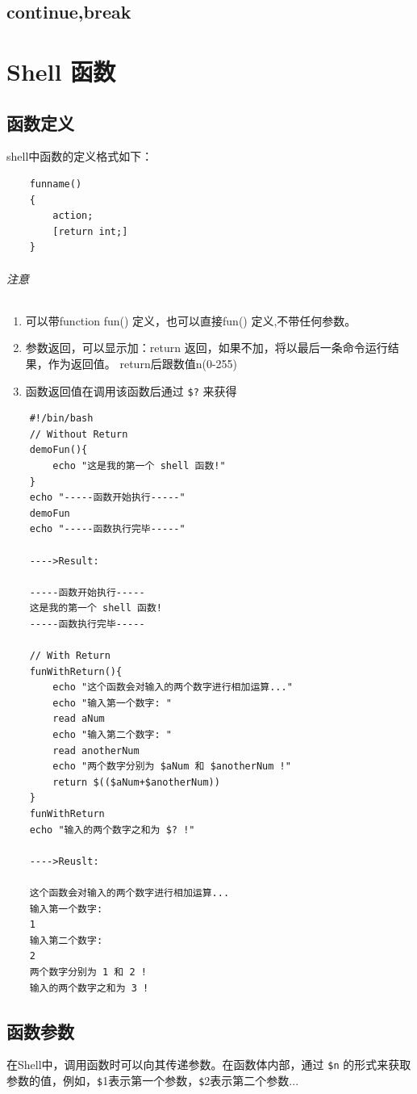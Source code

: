 \documentclass[UTF8,a4paper,12pt]{ctexbook}
\begin{document}
	\section{continue,break}
	
\chapter{Shell 函数}
	\section{函数定义}
			 shell中函数的定义格式如下：
		 	 \begin{lstlisting}
	funname()
	{
		action;
		[return int;]
	}
		 	 \end{lstlisting}
		 	 \subparagraph{注意}
			 	 \begin{enumerate}
			 	 	\item 可以带function fun() 定义，也可以直接fun() 定义,不带任何参数。
			 	 	\item 参数返回，可以显示加：return 返回，如果不加，将以最后一条命令运行结果，作为返回值。 return后跟数值n(0-255)
			 	 	\item 函数返回值在调用该函数后通过 \verb|$?| 来获得 
			 	 \end{enumerate}
			 	 \begin{lstlisting}
	#!/bin/bash
	// Without Return 
	demoFun(){
		echo "这是我的第一个 shell 函数!"
	}
	echo "-----函数开始执行-----"
	demoFun
	echo "-----函数执行完毕-----"
	
	---->Result:
	
	-----函数开始执行-----
	这是我的第一个 shell 函数!
	-----函数执行完毕-----
	
	// With Return
	funWithReturn(){
		echo "这个函数会对输入的两个数字进行相加运算..."
		echo "输入第一个数字: "
		read aNum
		echo "输入第二个数字: "
		read anotherNum
		echo "两个数字分别为 $aNum 和 $anotherNum !"
		return $(($aNum+$anotherNum))
	}
	funWithReturn
	echo "输入的两个数字之和为 $? !"		 	 
	
	---->Reuslt:
	
	这个函数会对输入的两个数字进行相加运算...
	输入第一个数字: 
	1
	输入第二个数字: 
	2
	两个数字分别为 1 和 2 !
	输入的两个数字之和为 3 !		
			\end{lstlisting}
			
	\section{函数参数}
			在Shell中，调用函数时可以向其传递参数。在函数体内部，通过 \verb|$n| 的形式来获取参数的值，例如，\verb|$|1表示第一个参数，\verb|$|2表示第二个参数... 
			
\end{document}
